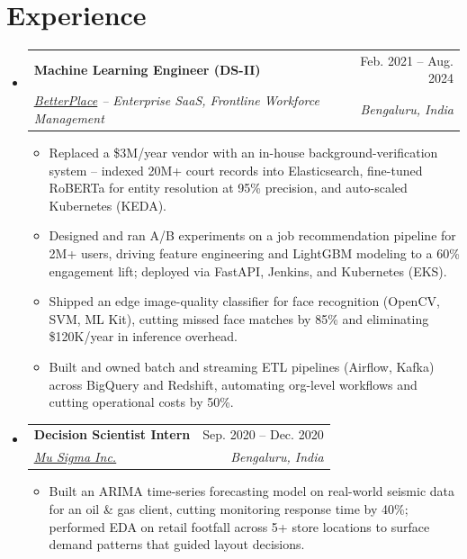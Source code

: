 \documentclass[letterpaper,11pt]{article}
\makeatletter
\newcommand{\resumeItem}[1]{
  \item\small{
    {#1 \vspace{-2pt}}
  }
}
\newcommand{\resumeSubheading}[4]{
  \vspace{-2pt}\item
    \begin{tabular*}{0.97\textwidth}[t]{l@{\extracolsep{\fill}}r}
      \textbf{#1} & #2 \\
      \textit{\small#3} & \textit{\small #4} \\
    \end{tabular*}\vspace{-7pt}
}
\newcommand{\resumeSubHeadingListStart}{\begin{itemize}[leftmargin=0.15in, label={}]}
\newcommand{\resumeSubHeadingListEnd}{\end{itemize}}
\newcommand{\resumeItemListStart}{\begin{itemize}}
\newcommand{\resumeItemListEnd}{\end{itemize}\vspace{-5pt}}
\makeatother
\begin{document}
\section{Experience}
  \resumeSubHeadingListStart
\resumeSubheading
       {Machine Learning Engineer (DS-II)}{Feb. 2021 -- Aug. 2024}
      {\href{https://www.betterplace.co.in/about-us}{\underline{BetterPlace}} -- Enterprise SaaS, Frontline Workforce Management}{Bengaluru, India}
      \resumeItemListStart
        \resumeItem{Replaced a \$3M/year vendor with an in-house background-verification system --  indexed 20M+ court records into Elasticsearch, fine-tuned RoBERTa for entity resolution at 95\% precision, and auto-scaled Kubernetes (KEDA).}
        \resumeItem{Designed and ran A/B experiments on a job recommendation pipeline for 2M+ users, driving feature engineering and LightGBM modeling to a 60\% engagement lift; deployed via FastAPI, Jenkins, and Kubernetes (EKS).}
        \resumeItem{Shipped an edge image-quality classifier for face recognition (OpenCV, SVM, ML Kit), cutting missed face matches by 85\% and eliminating \$120K/year in inference overhead.}
        \resumeItem{Built and owned batch and streaming ETL pipelines (Airflow, Kafka) across BigQuery and Redshift, automating org-level workflows and cutting operational costs by 50\%.}
      \resumeItemListEnd
\resumeSubheading
      {Decision Scientist Intern}{Sep. 2020 -- Dec. 2020}
      {\href{https://www.mu-sigma.com/}{\underline{Mu Sigma Inc.}}}{Bengaluru, India}
      \resumeItemListStart
        \resumeItem{Built an ARIMA time-series forecasting model on real-world seismic data for an oil \& gas client, cutting monitoring response time by 40\%; performed EDA on retail footfall across 5+ store locations to surface demand patterns that guided layout decisions.} 
      \resumeItemListEnd
    
    \vspace{-5pt}
  \resumeSubHeadingListEnd
\end{document}
